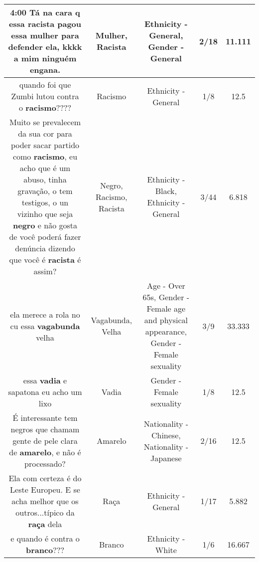 \documentclass[11pt]{article}
\newlength\mylength
\begin{document}
\begin{center}
\begin{longtable}{|C{.65\mylength}|C{.30\mylength}|C{.12\mylength}|C{.12\mylength}|C{.12\mylength}|}
  \small 4:00 Tá na cara q essa \textbf{racista} pagou essa \textbf{mulher}  para defender ela, kkkk  a mim ninguém engana.\normalsize   & Mulher, Racista & Ethnicity - General, Gender - General & 2/18 & 11.111 \\  \hline
  \small quando foi que Zumbi lutou contra o \textbf{racismo}????\normalsize   & Racismo & Ethnicity - General & 1/8 & 12.5 \\  \hline
  \small Muito se prevalecem da sua cor para poder sacar partido como \textbf{racismo}, eu acho que é um abuso, tinha gravação, o tem testigos, o un vizinho que seja \textbf{negro} e não gosta de você poderá fazer denúncia dizendo que você é \textbf{racista} é assim?\normalsize   & Negro, Racismo, Racista & Ethnicity - Black, Ethnicity - General & 3/44 & 6.818 \\  \hline
  \small ela merece a rola no cu essa \textbf{vagabunda} velha\normalsize   & Vagabunda, Velha & Age - Over 65s, Gender - Female age and physical appearance, Gender - Female sexuality & 3/9 & 33.333 \\  \hline
  \small essa \textbf{vadia} e sapatona eu acho um lixo\normalsize   & Vadia & Gender - Female sexuality & 1/8 & 12.5 \\  \hline
  \small É interessante tem negros que chamam gente de pele clara de \textbf{a\textbf{marelo}}, e não é processado?\normalsize   & Amarelo & Nationality - Chinese, Nationality - Japanese & 2/16 & 12.5 \\  \hline
  \small Ela com certeza é do Leste Europeu. E se acha melhor que os outros...típico da \textbf{raça} dela\normalsize   & Raça & Ethnicity - General & 1/17 & 5.882 \\  \hline
  \small e quando é contra o \textbf{branco}???\normalsize   & Branco & Ethnicity - White & 1/6 & 16.667 \\  \hline

\end{longtable}
\end{center}
\end{document}
